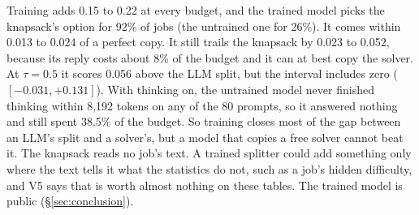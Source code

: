 Training adds 0.15 to 0.22 at every budget, and the trained model picks the knapsack's option for 92\% of jobs (the
untrained one for 26\%). It comes within 0.013 to 0.024 of a perfect copy. It still trails the knapsack by 0.023 to
0.052, because its reply costs about 8\% of the budget and it can at best copy the solver. At $\tau = 0.5$ it scores
0.056 above the LLM split, but the interval includes zero ($[-0.031, +0.131]$). With thinking on, the untrained model
never finished thinking within 8,192 tokens on any of the 80 prompts, so it answered nothing and still spent 38.5\% of
the budget. So training closes most of the gap between an LLM's split and a solver's, but a model that copies a free
solver cannot beat it. The knapsack reads no job's text. A trained splitter could add something only where the text
tells it what the statistics do not, such as a job's hidden difficulty, and V5 says that is worth almost nothing on
these tables. The trained model is public (\S\ref{sec:conclusion}).
